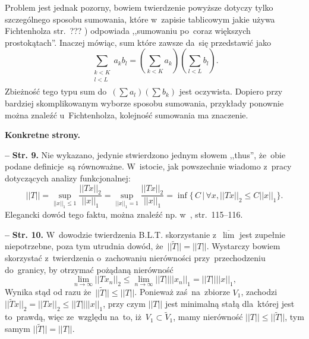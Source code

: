 \documentclass[a4paper,11pt]{article}
\newcommand{\spaceTwo}{1em}
\newcommand{\spaceThree}{0.5em}
\newcommand{\fr}{\frac}
\newcommand{\ol}{\overline}
\newcommand{\wt}{\widetilde}
\newcommand{\ra}{\rightarrow}
\newcommand{\Lim}{\lim\limits}
\newcommand{\Limsup}{\ol{\lim}}
\newcommand{\Sum}{\sum\limits}
\newcommand{\norm}[1]{\left|\left| #1 \right|\right|}
\newcommand{\tb}{\textbf}
\newcommand{\noi}{\noindent}
\newcommand{\start}{\noi \tb{--} {}}
\newcommand{\Str}[1]{\tb{Str. #1.}}
\begin{document}
Problem jest jednak pozorny, bowiem twierdzenie powyższe dotyczy tylko
szczególnego sposobu sumowania, które w~zapisie tablicowym jakie używa
Fichtenholza str.~??? \cite{Fichtenholz04}) odpowiada ,,sumowaniu
po~coraz większych prostokątach''. Inaczej mówiąc, sum które zawsze
da~się przedstawić jako
\begin{equation*}
  \Sum_{ \substack{ k < K \\ l < L \\ } } a_{ k } b_{ l }
  = ( \Sum_{ k < K } a_{ k } ) ( \Sum_{ l < L } b_{ l } ).
\end{equation*}
Zbieżność tego typu sum do~$( \Sum a_{ l } ) ( \Sum b_{ k } )$ jest
oczywista. Dopiero przy bardziej skomplikowanym wyborze sposobu
sumowania, przykłady ponownie można znaleźć u~Fichtenholza, kolejność
sumowania ma znaczenie. %

\vspace{\spaceTwo}



\noi \tb{Konkretne strony.}

\vspace{\spaceThree}


\start \Str{9} Nie wykazano, jedynie stwierdzono jednym słowem
,,thus'', że~obie podane definicje~są równoważne. W~istocie, jak
powszechnie wiadomo z~pracy dotyczących analizy funkcjonalnej:
\begin{displaymath}
  \norm{ T } = \sup_{ \norm{ x }_{ 1 } \leq 1 } \fr{ \norm{ T x }_{ 2 } }
  { \norm{ x }_{ 1 } }
  = \sup_{ \norm{ x }_{ 1 } = 1 } \fr{ \norm{ T x }_{ 2 } }
  { \norm{ x }_{ 1 } } = \inf \{ \, C \, | \, \forall x,
  \norm{ T x }_{ 2 } \leq C \norm{ x }_{ 1 } \}.
\end{displaymath}
Elegancki dowód tego faktu, można znaleźć np. w~\cite{Chmielinski04},
str.~115--116. %

\start \Str{10} W~dowodzie twierdzenia B.L.T. skorzystanie z~$\Limsup$
jest zupełnie niepotrzebne, poza tym utrudnia dowód,
że~$|| \tilde{ T } || = \norm{ T }$. Wystarczy bowiem skorzystać
z~twierdzenia o~zachowaniu nierówności przy~przechodzeniu do~granicy,
by otrzymać pożądaną nierówność
\begin{displaymath}
  \Lim_{ n \ra \infty } \norm{ T x_{ n } }_{ 2 }
  \leq \Lim_{ n \ra \infty } \norm{ T } \norm{ x_{ n } }_{ 1 }
  = \norm{ T } \norm{ x }_{ 1 },
\end{displaymath}
Wynika stąd od razu że~$|| \wt{ T } || \leq \norm{ T }$. Ponieważ
zaś~na~zbiorze $V_{ 1 }$, zachodzi
$|| \wt{ T } x ||_{ 2 } = \norm{ T x }_{ 2 } \leq \norm{ T } \norm{ x
}_{ 1 }$, przy czym $\norm{ T }$ jest minimalną stałą dla~której jest
to~prawdą, więc ze~względu na~to, iż~$V_{ 1 } \subset \wt{ V }_{ 1 }$,
mamy nierówność $\norm{ T } \leq || \wt{ T } ||$, tym samym
$|| \wt{ T } || = \norm{ T }$. %
\end{document}
